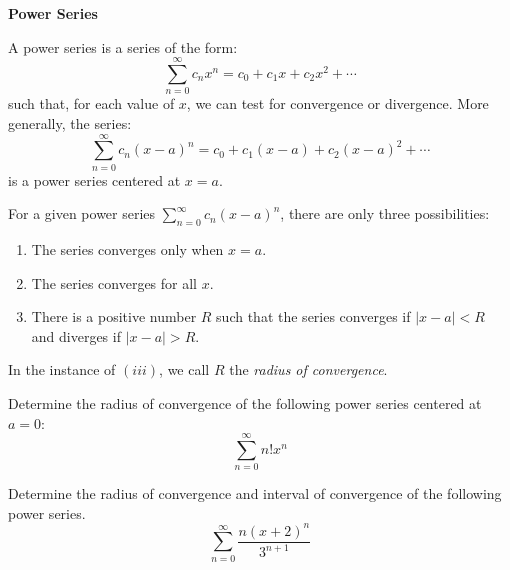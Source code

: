 
\chead{\today}
\graphicspath{ {\string~/Desktop} }
\usetikzlibrary{arrows}
\newcommand{\ans}[1]{ \noindent {\color{red} \textbf{Answer:} #1}}
\renewcommand{\ans}[1]{\vspace{3in}}

\begin{center}
\textbf{Power Series}
\end{center}

\begin{defi}
	A power series is a series of the form:
	\[
		\sum_{n =0}^\infty c_n x^n = c_0 + c_1 x + c_2 x^2 + \cdots 
	\]
	such that, for each value of $x$, we can test for convergence or divergence. More generally, the series:
	\[
		\sum_{n =0}^\infty c_n (x-a)^n = c_0 + c_1 (x-a) + c_2 (x-a)^2 + \cdots 
	\]
	is a power series centered at $x = a$. 
\end{defi}

\begin{thm}
	For a given power series $\sum_{n=0}^{\infty} c_n(x-a)^n$, there are only three possibilities:
	\begin{enumerate}[label=$(\roman*)$]
		\item The series converges only when $x=a$.
		\item The series converges for all $x$.
		\item There is a positive number $R$ such that the series converges if $|x-a|<R$ and diverges if $|x-a|>R$.
	\end{enumerate}
	In the instance of $(iii)$, we call $R$ the \emph{radius of convergence}.
\end{thm}

\begin{exx}
	Determine the radius of convergence of the following power series centered at $a = 0$:
	\[
		\sum_{n = 0}^\infty n! x^n
	\]
\end{exx}
\ans{Whenever we see a factorial, our heads should immediately think: \emph{ratio test}:
\[
\lim_{n \to \infty} \lrabs{\frac{a_{n+1}}{a_n}} = \lim_{n \to \infty} \lrabs{\frac{(n+1)!x^n}{n! x^n}} = \lim_{n \to \infty} \lrabs{(n + 1)x} < \infty
\]
where the last inequality holds if and only if $x = 0$. 
}

\begin{exx}
	Determine the radius of convergence and interval of convergence of the following power series. 
	\[
	\sum_{n = 0}^\infty \frac{n(x+2)^n}{3^{n+1}}
	\]
\end{exx}

